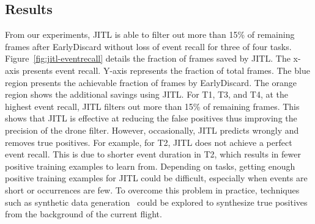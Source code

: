 \subsection{Results}




From our experiments, JITL is able to filter out more than 15\% of remaining
frames after EarlyDiscard without loss of event recall for three of four tasks.
Figure~\ref{fig:jitl-eventrecall} details the fraction of frames saved by JITL.
The x-axis presents event recall. Y-axis represents the fraction of total
frames. The blue region presents the achievable fraction of frames by
EarlyDiscard. The orange region shows the additional savings using JITL. For T1,
T3, and T4, at the highest event recall, JITL filters out more than 15\% of
remaining frames. This shows that JITL is effective at reducing the false
positives thus improving the precision of the drone filter. However,
occasionally, JITL predicts wrongly and removes true positives. For example, for
T2, JITL does not achieve a perfect event recall. This is due to shorter event
duration in T2, which results in fewer positive training examples to learn
from. Depending on tasks, getting enough positive training examples for JITL
could be difficult, especially when events are short or occurrences are few. To
overcome this problem in practice, techniques such as synthetic data
generation~\cite{Dwibedi2017} could be explored to synthesize true positives
from the background of the current flight.


